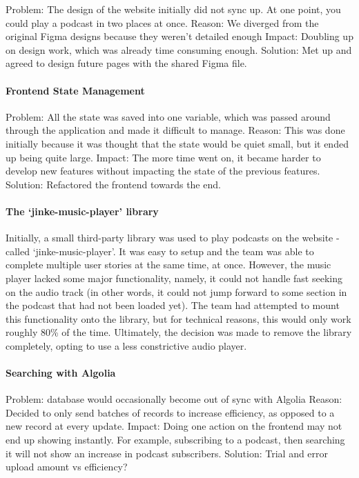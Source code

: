 \documentclass[../report.tex]{subfiles}
\begin{document}
Problem: The design of the website initially did not sync up. At one point, you could play a podcast in two places at once.
Reason: We diverged from the original Figma designs because they weren't detailed enough
Impact: Doubling up on design work, which was already time consuming enough.
Solution: Met up and agreed to design future pages with the shared Figma file.

\paragraph{Frontend State Management}

Problem: All the state was saved into one variable, which was passed around through the application and made it difficult to manage.
Reason: This was done initially because it was thought that the state would be quiet small, but it ended up being quite large.
Impact: The more time went on, it became harder to develop new features without impacting the state of the previous features.
Solution: Refactored the frontend towards the end.

\paragraph{The `jinke-music-player' library}

Initially, a small third-party library was used to play podcasts on the website - called `jinke-music-player'.
It was easy to setup and the team was able to complete multiple user stories at the same time, at once.
However, the music player lacked some major functionality, namely, it could not handle fast seeking on the audio track (in other words, it could not jump forward to some section in the podcast that had not been loaded yet).
The team had attempted to mount this functionality onto the library, but for technical reasons, this would only work roughly 80\% of the time.
Ultimately, the decision was made to remove the library completely, opting to use a less constrictive audio player.

\paragraph{Searching with Algolia}

Problem: database would occasionally become out of sync with Algolia
Reason: Decided to only send batches of records to increase efficiency, as opposed to a new record at every update.
Impact: Doing one action on the frontend may not end up showing instantly. For example, subscribing to a podcast, then searching it will not show an increase in podcast subscribers.
Solution: Trial and error upload amount vs efficiency?
\end{document}
